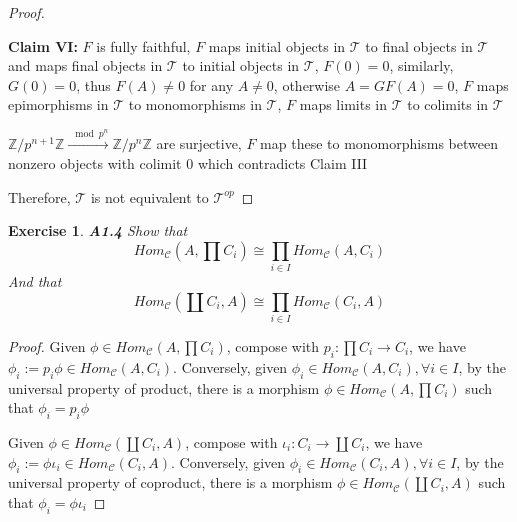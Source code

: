 \documentclass{article}
\newtheorem*{exercise}{Exercise}
\theoremstyle{definition}
\theoremstyle{remark}
\theoremstyle{definition}
\begin{document}
\begin{proof}
\begin{center}
\end{center}
\textbf{Claim VI: }$F$ is fully faithful, $F$ maps initial objects in $\mathcal T$ to final objects in $\mathcal T$ and maps final objects in $\mathcal T$ to initial objects in $\mathcal T$, $F(0)=0$, similarly, $G(0)=0$, thus $F(A)\neq0$ for any $A\neq0$, otherwise $A=GF(A)=0$, $F$ maps epimorphisms in $\mathcal T$ to monomorphisms in $\mathcal T$, $F$ maps limits in $\mathcal T$ to colimits in $\mathcal T$ \par
$\mathbb Z/p^{n+1}\mathbb Z\xrightarrow{\mod p^n}\mathbb Z/p^n\mathbb Z$ are surjective, $F$ map these to monomorphisms between nonzero objects with colimit $0$ which contradicts Claim III \par
Therefore, $\mathcal T$ is not equivalent to $\mathcal T^{op}$
\end{proof}

\begin{exercise}{\textbf{A1.4}}
Show that 
\[Hom_{\mathcal C}\left(A,\prod C_i\right)\cong\prod_{i\in I}Hom_{\mathcal C}\left(A,C_i\right)\]
And that 
\[Hom_{\mathcal C}\left(\coprod C_i,A\right)\cong\prod_{i\in I}Hom_{\mathcal C}\left(C_i,A\right)\]
\end{exercise}

\begin{proof}
Given $\phi\in Hom_{\mathcal C}\left(A,\prod C_i\right)$, compose with $p_i:\prod C_i\to C_i$, we have $\phi_i:=p_i\phi\in Hom_{\mathcal C}\left(A,C_i\right)$. Conversely, given $\phi_i\in Hom_{\mathcal C}\left(A,C_i\right),\forall i\in I$, by the universal property of product, there is a morphism $\phi\in Hom_{\mathcal C}\left(A,\prod C_i\right)$ such that $\phi_i=p_i\phi$ \par
Given $\phi\in Hom_{\mathcal C}\left(\coprod C_i,A\right)$, compose with $\iota_i:C_i\to\coprod C_i$, we have $\phi_i:=\phi\iota_i\in Hom_{\mathcal C}\left(C_i,A\right)$. Conversely, given $\phi_i\in Hom_{\mathcal C}\left(C_i,A\right),\forall i\in I$, by the universal property of coproduct, there is a morphism $\phi\in Hom_{\mathcal C}\left(\coprod C_i,A\right)$ such that $\phi_i=\phi\iota_i$
\end{proof}
\end{document}
